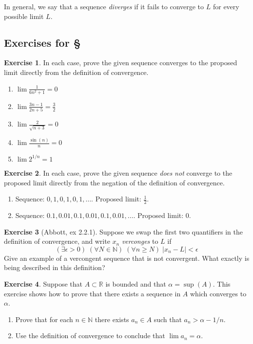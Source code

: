 \documentclass[11pt,oneside]{amsbook}
\newcommand{\NN}{\mathbb N}
\newcommand{\RR}{\mathbb R}
\theoremstyle{definition}
\newtheorem{exerc}{Exercise}[section]
\theoremstyle{plain}
\theoremstyle{definition}
\theoremstyle{remark}
\numberwithin{equation}{section}
\numberwithin{figure}{section}
\begin{document}
In general, we say that a sequence \emph{diverges} if it fails to converge to $L$ for every possible limit $L$.

\newpage
\subsection*{Exercises for \S \thesection}

\begin{exerc}
  In each case, prove the given sequence converges to the proposed limit directly from the definition of convergence.
  \begin{enumerate}
    \item $\displaystyle\lim\frac{1}{6n^2+1}=0$
    \item $\displaystyle\lim\frac{3n-1}{2n+5}=\frac32$
    \item $\displaystyle\lim\frac{2}{\sqrt{n+3}}=0$
    \item $\displaystyle\lim\frac{\sin(n)}{n}=0$
    \item $\displaystyle\lim2^{1/n}=1$
  \end{enumerate}
\end{exerc}

\begin{exerc}
  In each case, prove the given sequence \emph{does not} converge to the proposed limit directly from the negation of the definition of convergence.
  \begin{enumerate}
    \item Sequence: $0,1,0,1,0,1,\ldots$. Proposed limit: $\frac12$.
    \item Sequence: $0.1,0.01,0.1,0.01,0.1,0.01,\ldots$. Proposed limit: $0$.
  \end{enumerate}
\end{exerc}

\begin{exerc}[Abbott, ex 2.2.1]
  Suppose we swap the first two quantifiers in the definition of convergence, and write $x_n$ \emph{verconges} to $L$ if
  \[(\exists\epsilon>0)\;(\forall N\in\NN)\;(\forall n\geq N)\;|x_n-L|<\epsilon
  \]
  Give an example of a vercongent sequence that is not convergent. What exactly is being described in this definition?
\end{exerc}
  
\begin{exerc}
  Suppose that $A\subset\RR$ is bounded and that $\alpha=\sup(A)$.  This exercise shows how to prove that there exists a sequence in $A$ which converges to $\alpha$.
  \begin{enumerate}
    \item Prove that for each $n\in\NN$ there exists $a_n\in A$ such that $a_n>\alpha-1/n$.
    \item Use the definition of convergence to conclude that $\lim a_n=\alpha$.
  \end{enumerate}
\end{exerc}
\end{document}

